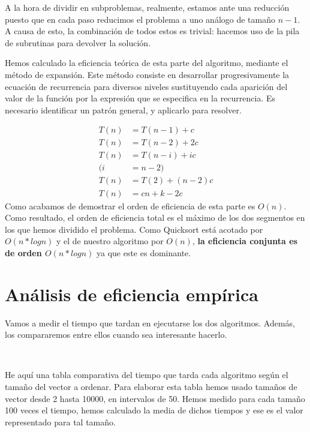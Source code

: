 \documentclass{article}
\begin{document}
	A la hora de dividir en subproblemas, realmente, estamos ante una reducción puesto que en cada paso reducimos el problema a uno análogo de tamaño $n-1$. A causa de esto, la combinación de todos estos es trivial: hacemos uso de la pila de subrutinas para devolver la solución.
	\
	
	Hemos calculado la eficiencia teórica de esta parte del algoritmo, mediante el método de expansión. Este método  consiste en desarrollar progresivamente la ecuación de recurrencia para diversos niveles sustituyendo cada aparición del valor de la función por la expresión que se especifica en la recurrencia. Es necesario identificar un patrón general, y aplicarlo para resolver.
	

\begin{align*}
	T(n) &= T(n-1) + c \\
	T(n) &= T(n-2) + 2c \\
	T(n) &= T(n-i) + ic \\
		(i &= n - 2) \\
	T(n) &= T(2) + (n-2)c \\
	T(n) &= cn + k - 2c
\end{align*}
Como acabamos de demostrar el orden de eficiencia de esta parte es $O(n)$.
	Como resultado, el orden de eficiencia total es el máximo de los dos segmentos en los que hemos dividido el problema. Como Quicksort está acotado por $O(n*log n)$ y el de
nuestro algoritmo por $O(n)$, \textbf{la eficiencia conjunta es de orden $O(n*log n)$} ya que este es 
dominante.
	\section{Análisis de eficiencia empírica}
	Vamos a medir el tiempo que tardan en ejecutarse los dos algoritmos.	Además, los compararemos entre ellos cuando sea interesante hacerlo.
	
	
	\
	
	He aquí una tabla comparativa del tiempo que tarda cada algoritmo según el tamaño del vector a ordenar. Para elaborar esta tabla hemos usado tamaños de vector desde 2 hasta 10000, en intervalos de 50. Hemos medido para cada tamaño 100 veces el tiempo, hemos calculado la media de dichos tiempos y ese es el valor representado para tal tamaño.
	
\end{document}
